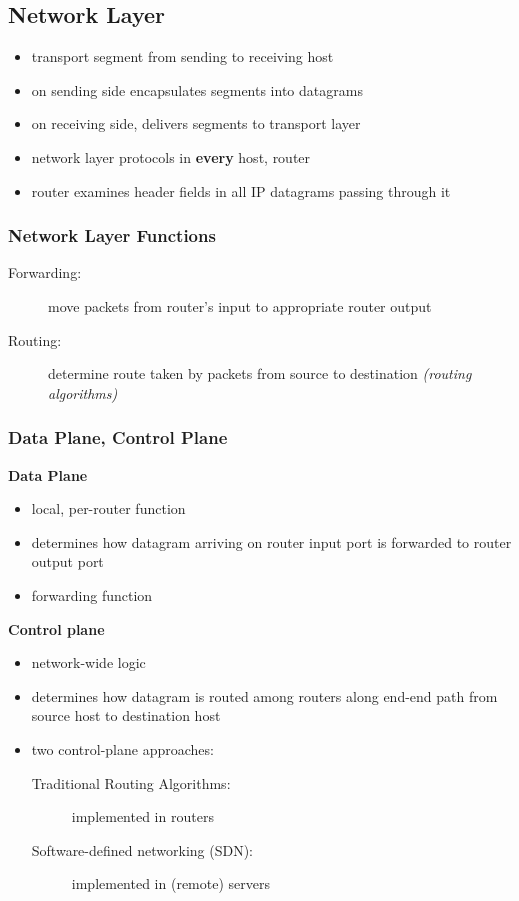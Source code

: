 \subsection{Network Layer}
\begin{itemize}
	\item transport segment from sending to receiving host
	\item on sending side encapsulates segments into datagrams
	\item on receiving side, delivers segments to transport layer
	\item network layer protocols in \textbf{every} host, router
	\item router examines header fields in all IP datagrams passing through it
\end{itemize}
\subsubsection{Network Layer Functions}
\begin{description}
	\item[Forwarding:] move packets from router's input to appropriate router output
	\item[Routing:] determine route taken by packets from source to destination \textit{(routing algorithms)}
\end{description}
\subsubsection{Data Plane, Control Plane}
\textbf{Data Plane}
\begin{itemize}
	\item local, per-router function
	\item determines how datagram arriving on router input port is forwarded to router output port
	\item forwarding function
\end{itemize}
\textbf{Control plane}
\begin{itemize}
	\item network-wide logic
	\item determines how datagram is routed among routers along end-end path from source host to destination host
	\item two control-plane approaches:
	\begin{description}
		\item[Traditional Routing Algorithms:] implemented in routers
		\item[Software-defined networking (SDN):] implemented in (remote) servers
	\end{description}
\end{itemize}

